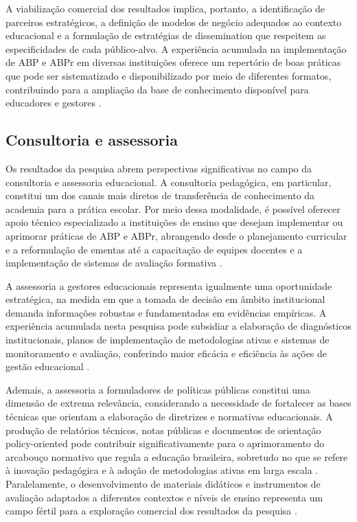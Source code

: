 A viabilização comercial dos resultados implica, portanto, a identificação de parceiros estratégicos, a definição de modelos de negócio adequados ao contexto educacional e a formulação de estratégias de dissemination que respeitem as especificidades de cada público-alvo. A experiência acumulada na implementação de ABP e ABPr em diversas instituições oferece um repertório de boas práticas que pode ser sistematizado e disponibilizado por meio de diferentes formatos, contribuindo para a ampliação da base de conhecimento disponível para educadores e gestores \cite{BENDER2005}.

\subsection{Consultoria e assessoria}
\label{subsec:consultoria}

Os resultados da pesquisa abrem perspectivas significativas no campo da consultoria e assessoria educacional. A consultoria pedagógica, em particular, constitui um dos canais mais diretos de transferência de conhecimento da academia para a prática escolar. Por meio dessa modalidade, é possível oferecer apoio técnico especializado a instituições de ensino que desejam implementar ou aprimorar práticas de ABP e ABPr, abrangendo desde o planejamento curricular e a reformulação de ementas até a capacitação de equipes docentes e a implementação de sistemas de avaliação formativa \cite{MUNHOZ2015}.

A assessoria a gestores educacionais representa igualmente uma oportunidade estratégica, na medida em que a tomada de decisão em âmbito institucional demanda informações robustas e fundamentadas em evidências empíricas. A experiência acumulada nesta pesquisa pode subsidiar a elaboração de diagnósticos institucionais, planos de implementação de metodologias ativas e sistemas de monitoramento e avaliação, conferindo maior eficácia e eficiência às ações de gestão educacional \cite{LIBANEO2006}.

Ademais, a assessoria a formuladores de políticas públicas constitui uma dimensão de extrema relevância, considerando a necessidade de fortalecer as bases técnicas que orientam a elaboração de diretrizes e normativas educacionais. A produção de relatórios técnicos, notas públicas e documentos de orientação policy-oriented pode contribuir significativamente para o aprimoramento do arcabouço normativo que regula a educação brasileira, sobretudo no que se refere à inovação pedagógica e à adoção de metodologias ativas em larga escala \cite{VEIGA2014}. Paralelamente, o desenvolvimento de materiais didáticos e instrumentos de avaliação adaptados a diferentes contextos e níveis de ensino representa um campo fértil para a exploração comercial dos resultados da pesquisa \cite{BENDER2005}.

